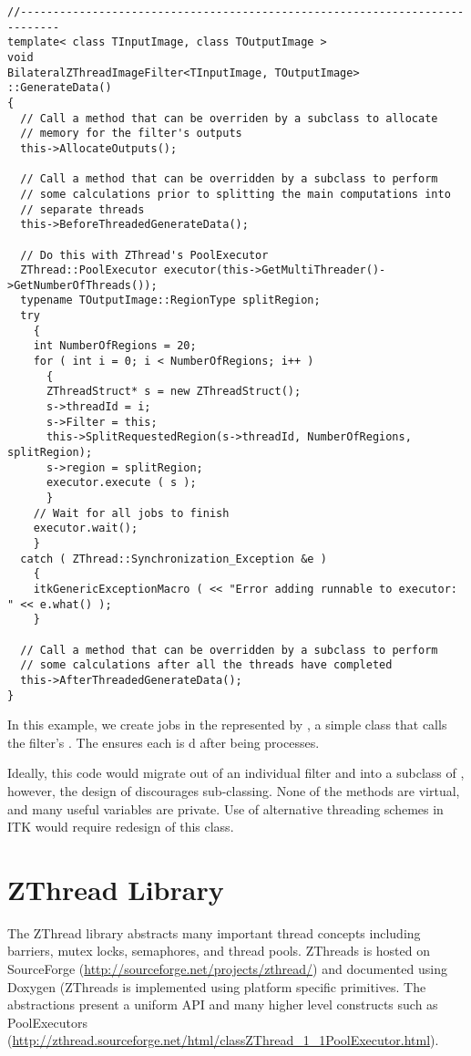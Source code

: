\documentclass{InsightArticle}
\begin{document}
\begin{verbatim}
//----------------------------------------------------------------------------
template< class TInputImage, class TOutputImage >
void
BilateralZThreadImageFilter<TInputImage, TOutputImage>
::GenerateData()
{
  // Call a method that can be overriden by a subclass to allocate
  // memory for the filter's outputs
  this->AllocateOutputs();
  
  // Call a method that can be overridden by a subclass to perform
  // some calculations prior to splitting the main computations into
  // separate threads
  this->BeforeThreadedGenerateData();

  // Do this with ZThread's PoolExecutor
  ZThread::PoolExecutor executor(this->GetMultiThreader()->GetNumberOfThreads());
  typename TOutputImage::RegionType splitRegion;
  try
    {
    int NumberOfRegions = 20;
    for ( int i = 0; i < NumberOfRegions; i++ )
      {
      ZThreadStruct* s = new ZThreadStruct();
      s->threadId = i;
      s->Filter = this;
      this->SplitRequestedRegion(s->threadId, NumberOfRegions, splitRegion);
      s->region = splitRegion;
      executor.execute ( s );
      }
    // Wait for all jobs to finish
    executor.wait();
    }
  catch ( ZThread::Synchronization_Exception &e )
    {
    itkGenericExceptionMacro ( << "Error adding runnable to executor: " << e.what() );
    }

  // Call a method that can be overridden by a subclass to perform
  // some calculations after all the threads have completed
  this->AfterThreadedGenerateData();
}
\end{verbatim}

In this example, we create  jobs in the  represented by , a simple class that calls the filter's .  The  ensures each  is d after being processes.

Ideally, this code would migrate out of an individual filter and into a subclass of , however, the design of  discourages sub-classing.  None of the methods are virtual, and many useful variables are private.  Use of alternative threading schemes in ITK would require redesign of this class.

\section{ZThread Library}
The ZThread library abstracts many important thread concepts including barriers, mutex locks, semaphores, and thread pools.  ZThreads is hosted on SourceForge (\url{http://sourceforge.net/projects/zthread/}) and documented using Doxygen (ZThreads is implemented using platform specific primitives.  The abstractions present a uniform API and many higher level constructs such as PoolExecutors (\url{http://zthread.sourceforge.net/html/classZThread_1_1PoolExecutor.html}).
\end{document}

